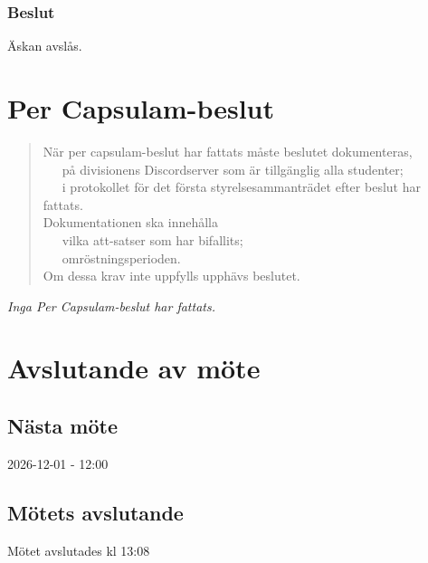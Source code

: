 \documentclass[protokoll]{dvd}
\begin{document}
\subsubsection{Beslut} 
\begin{attsatser}     
\item Äskan avslås. 
\end{attsatser}


\section{Per Capsulam-beslut}
\blockquote[]{
När per capsulam-beslut har fattats måste beslutet dokumenteras,\\
\ \cdot\ \ på divisionens Discordserver som är tillgänglig alla studenter;\\
\ \cdot\ \ i protokollet för det första styrelsesammanträdet efter beslut har fattats.\\

Dokumentationen ska innehålla\\
\ \cdot\ \ vilka att-satser som har bifallits;\\
\ \cdot\ \ omröstningsperioden.\\

Om dessa krav inte uppfylls upphävs beslutet.
}
\textit{Inga Per Capsulam-beslut har fattats.}


\newpage
\section{Avslutande av möte}

\subsection{Nästa möte}
2026-12-01 - 12:00

\subsection{Mötets avslutande}
Mötet avslutades kl 13:08 

\styrelsesignaturer
\end{document}
